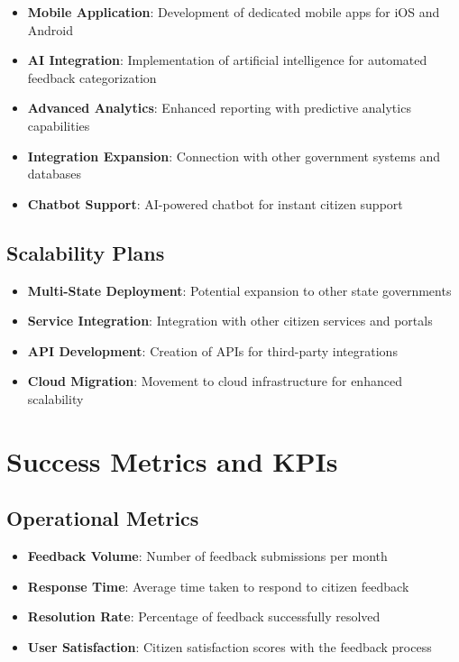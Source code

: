 \documentclass[12pt,a4paper]{article}
\begin{document}
\begin{itemize}[leftmargin=2em]
    \item \textbf{Mobile Application}: Development of dedicated mobile apps for iOS and Android
    \item \textbf{AI Integration}: Implementation of artificial intelligence for automated feedback categorization
    \item \textbf{Advanced Analytics}: Enhanced reporting with predictive analytics capabilities
    \item \textbf{Integration Expansion}: Connection with other government systems and databases
    \item \textbf{Chatbot Support}: AI-powered chatbot for instant citizen support
\end{itemize}

\subsection{Scalability Plans}

\begin{itemize}[leftmargin=2em]
    \item \textbf{Multi-State Deployment}: Potential expansion to other state governments
    \item \textbf{Service Integration}: Integration with other citizen services and portals
    \item \textbf{API Development}: Creation of APIs for third-party integrations
    \item \textbf{Cloud Migration}: Movement to cloud infrastructure for enhanced scalability
\end{itemize}

\section{Success Metrics and KPIs}

\subsection{Operational Metrics}

\begin{itemize}[leftmargin=2em]
    \item \textbf{Feedback Volume}: Number of feedback submissions per month
    \item \textbf{Response Time}: Average time taken to respond to citizen feedback
    \item \textbf{Resolution Rate}: Percentage of feedback successfully resolved
    \item \textbf{User Satisfaction}: Citizen satisfaction scores with the feedback process
\end{itemize}
\end{document}
